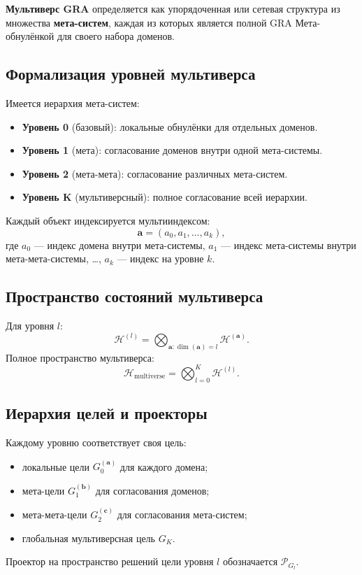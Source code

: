\documentclass[12pt,a4paper]{article}
\begin{document}
\textbf{Мультиверс GRA} определяется как упорядоченная или сетевая структура из множества \textbf{мета-систем}, каждая из которых является полной GRA Мета-обнулёнкой для своего набора доменов.

\subsection{Формализация уровней мультиверса}

Имеется иерархия мета-систем:
\begin{itemize}
    \item \textbf{Уровень 0} (базовый): локальные обнулёнки для отдельных доменов.
    \item \textbf{Уровень 1} (мета): согласование доменов внутри одной мета-системы.
    \item \textbf{Уровень 2} (мета-мета): согласование различных мета-систем.
    \item \textbf{Уровень K} (мультиверсный): полное согласование всей иерархии.
\end{itemize}

Каждый объект индексируется мультииндексом:
\[
\mathbf{a} = (a_0, a_1, \dots, a_k),
\]
где \(a_0\) — индекс домена внутри мета-системы, \(a_1\) — индекс мета-системы внутри мета-мета-системы, …, \(a_k\) — индекс на уровне \(k\).

\subsection{Пространство состояний мультиверса}

Для уровня \(l\):
\[
\mathcal{H}^{(l)} = \bigotimes_{\mathbf{a}: \dim(\mathbf{a})=l} \mathcal{H}^{(\mathbf{a})}.
\]
Полное пространство мультиверса:
\[
\mathcal{H}_{\text{multiverse}} = \bigotimes_{l=0}^K \mathcal{H}^{(l)}.
\]

\subsection{Иерархия целей и проекторы}

Каждому уровню соответствует своя цель:
\begin{itemize}
    \item локальные цели \(G_0^{(\mathbf{a})}\) для каждого домена;
    \item мета-цели \(G_1^{(\mathbf{b})}\) для согласования доменов;
    \item мета-мета-цели \(G_2^{(\mathbf{c})}\) для согласования мета-систем;
    \item глобальная мультиверсная цель \(G_K\).
\end{itemize}
Проектор на пространство решений цели уровня \(l\) обозначается \(\mathcal{P}_{G_l}\).
\end{document}

